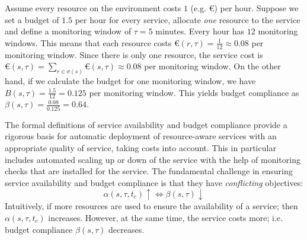 \begin{exmp}
Assume every resource on the environment costs $1$ (e.g. $\euro$) per hour.
Suppose we set a budget of $1.5$ per hour for every service,
allocate \emph{one} resource to the service and define a monitoring window of $\tau = 5$ minutes.
Every hour has $12$ monitoring windows.
This means that each resource costs $\euro(r,\tau) = \frac{1}{12} \approx 0.08$ per monitoring window.
Since there is only one resource, the service cost is $\euro(s,\tau) = \sum_{r\in\sigma(s)}\euro(s,\tau) \approx 0.08$ per monitoring window.
On the other hand, if we calculate the budget for one monitoring window, we have $B(s,\tau) = \frac{1.5}{12} = 0.125$ per monitoring window.
This yields budget compliance as $\beta(s,\tau) = \frac{0.08}{0.125} = 0.64$.
\end{exmp}
% 

% 

The formal definitions of service availability and budget compliance provide a rigorous 
basis for automatic deployment of resource-aware services with an appropriate quality of service, taking costs into account.
This in particular includes automated scaling up or down of the service with the help of monitoring checks that are installed for the service. 
The fundamental challenge in ensuring service availability and budget compliance is that they have \emph{conflicting} objectives:
\[
\alpha(s,\tau,t_c) \uparrow \iff \beta(s,\tau) \downarrow
\]
Intuitively, if more resources are used to ensure the availability of a service; then $\alpha(s,\tau,t_c)$ increases.
However, at the same time, the service costs more; i.e. budget compliance $\beta(s,\tau)$ decreases.

